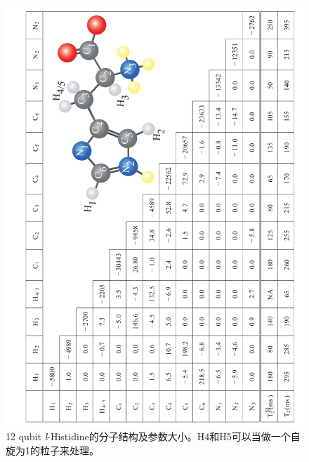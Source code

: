  \begin{figure}[htbp]
            \begin{center}
              \includegraphics[width= 0.8\columnwidth]{figures/samplemost.pdf}
              \caption{12 qubit \emph{l}-Histidine的分子结构及参数大小。H4和H5可以当做一个自旋为1的粒子来处理。}
              \label{samplemost}
            \end{center}
\end{figure}